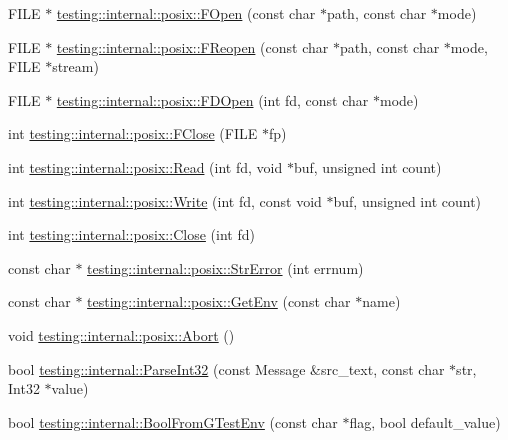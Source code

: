 \begin{DoxyCompactItemize}
\item 
F\-I\-L\-E $\ast$ \hyperlink{namespacetesting_1_1internal_1_1posix_affa05d06d3e3b1ce975935cb0eac4fa7}{testing\-::internal\-::posix\-::\-F\-Open} (const char $\ast$path, const char $\ast$mode)
\item 
F\-I\-L\-E $\ast$ \hyperlink{namespacetesting_1_1internal_1_1posix_a7428e40e37fc1798e36804eafc11680b}{testing\-::internal\-::posix\-::\-F\-Reopen} (const char $\ast$path, const char $\ast$mode, F\-I\-L\-E $\ast$stream)
\item 
F\-I\-L\-E $\ast$ \hyperlink{namespacetesting_1_1internal_1_1posix_a78eb38374e5a5c87ab0cbb30583627f7}{testing\-::internal\-::posix\-::\-F\-D\-Open} (int fd, const char $\ast$mode)
\item 
int \hyperlink{namespacetesting_1_1internal_1_1posix_af4beeaaa8d62916d5e3b644a1ddfbd6b}{testing\-::internal\-::posix\-::\-F\-Close} (F\-I\-L\-E $\ast$fp)
\item 
int \hyperlink{namespacetesting_1_1internal_1_1posix_a3c6ab13e581a56f1b02f3eb7536c97fd}{testing\-::internal\-::posix\-::\-Read} (int fd, void $\ast$buf, unsigned int count)
\item 
int \hyperlink{namespacetesting_1_1internal_1_1posix_af4acf9f78d55f815a18b43786511abef}{testing\-::internal\-::posix\-::\-Write} (int fd, const void $\ast$buf, unsigned int count)
\item 
int \hyperlink{namespacetesting_1_1internal_1_1posix_a15e5b8f2a535ef1b2529b85b861e4846}{testing\-::internal\-::posix\-::\-Close} (int fd)
\item 
const char $\ast$ \hyperlink{namespacetesting_1_1internal_1_1posix_a6e7e77c37cacb64c32234b988b10933c}{testing\-::internal\-::posix\-::\-Str\-Error} (int errnum)
\item 
const char $\ast$ \hyperlink{namespacetesting_1_1internal_1_1posix_aa78973d3f7aa4efd24742b0537c8cd50}{testing\-::internal\-::posix\-::\-Get\-Env} (const char $\ast$name)
\item 
void \hyperlink{namespacetesting_1_1internal_1_1posix_a69b8278c59359dd6a6f941b4643db9fb}{testing\-::internal\-::posix\-::\-Abort} ()
\item 
bool \hyperlink{namespacetesting_1_1internal_ac06fc81336a3d80755f4020d34321766}{testing\-::internal\-::\-Parse\-Int32} (const Message \&src\-\_\-text, const char $\ast$str, Int32 $\ast$value)
\item 
bool \hyperlink{namespacetesting_1_1internal_a1055088bb9b867e1b7b8f096f519d7c5}{testing\-::internal\-::\-Bool\-From\-G\-Test\-Env} (const char $\ast$flag, bool default\-\_\-value)

\end{DoxyCompactItemize}
